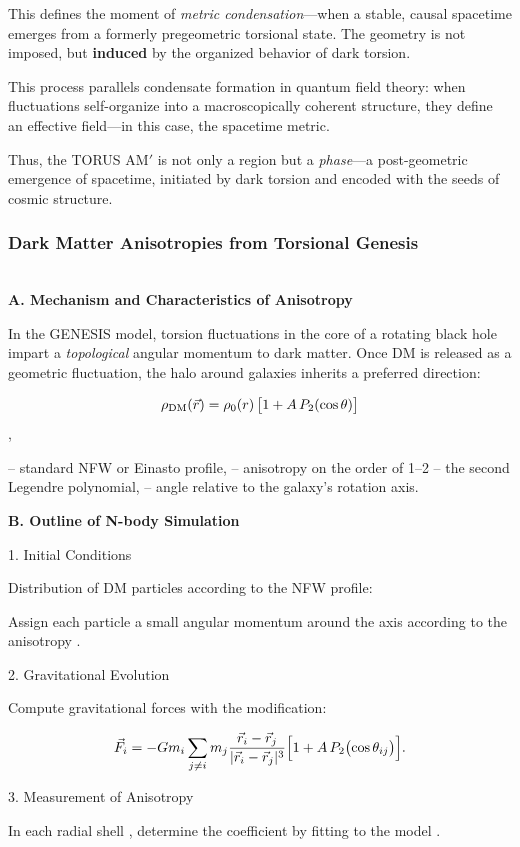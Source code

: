 \documentclass{article}
\begin{document}
This defines the moment of \textit{metric condensation}---when a stable, causal spacetime emerges from a formerly pregeometric torsional state. The geometry is not imposed, but \textbf{induced} by the organized behavior of dark torsion.

This process parallels condensate formation in quantum field theory: when fluctuations self-organize into a macroscopically coherent structure, they define an effective field---in this case, the spacetime metric.

Thus, the TORUS AM$'$ is not only a region but a \textit{phase}---a post-geometric emergence of spacetime, initiated by dark torsion and encoded with the seeds of cosmic structure.


\subsubsection{Dark Matter Anisotropies from Torsional Genesis}\\

 \textbf{A. Mechanism and Characteristics of Anisotropy}

In the GENESIS model, torsion fluctuations in the core of a rotating black hole impart a \emph{topological} angular momentum to dark matter. Once DM is released as a geometric fluctuation, the halo around galaxies inherits a preferred direction:

\[ 
  \rho_{\rm DM}(\vec r) = \rho_0(r)\,\bigl[1 + A\,P_2(\cos\theta)\bigr] 
\],

– standard NFW or Einasto profile,  
– anisotropy on the order of 1–2%
– the second Legendre polynomial,  
– angle relative to the galaxy’s rotation axis.  

\textbf{B. Outline of N-body Simulation}

1. Initial Conditions

Distribution of DM particles according to the NFW profile:

Assign each particle a small angular momentum around the axis  according to the anisotropy .

2. Gravitational Evolution

Compute gravitational forces with the modification:

\[
  \vec F_i = -Gm_i \sum_{j\neq i} m_j \frac{\vec r_i - \vec r_j}{|\vec r_i - \vec r_j|^3}
       \Bigl[1 + A\,P_2\bigl(\cos\theta_{ij}\bigr)\Bigr].
\]

3. Measurement of Anisotropy

In each radial shell , determine the coefficient  by fitting to the model .
\end{document}
